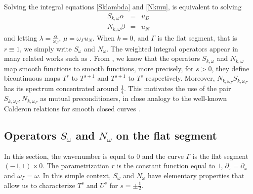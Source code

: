 \documentclass[a4paper]{article}
\begin{document}
Solving the integral equations \eqref{Sklambda} and \eqref{Nkmu}, is equivalent to solving
\begin{eqnarray*}
	S_{k,\omega} \alpha &=& u_D\\
	N_{k,\omega} \beta &=& u_N
\end{eqnarray*}
and letting $\lambda = \frac{\alpha}{\omega_\Gamma}$, $\mu = \omega_\Gamma u_N$. 
When $k = 0$, and $\Gamma$ is the flat segment, that is $r \equiv 1$, we simply write $S_{\omega}$ and $N_{\omega}$. The weighted integral operators appear in many related works such as \cite{bruno2012second,jerez2012explicit,jiang2004second}. From \cite{bruno2012second}, we know that the operators $S_{k,\omega}$ and $N_{k,\omega}$ map smooth functions to smooth functions, more precisely, for $s > 0$, they define bicontinuous maps $T^s$ to $T^{s+1}$ and $T^{s+1}$ to $T^{s}$ respectively. Moreover, $N_{k,\omega_\Gamma} S_{k,\omega_\Gamma}$ has its spectrum concentrated around $\frac{1}{4}$. This motivates the use of the pair $S_{k,\omega_\Gamma}, N_{k,\omega_\Gamma}$ as mutual preconditioners, in close analogy to the well-known Calderon relations for smooth closed curves .

\subsection{Operators $S_\omega$ and $N_\omega$ on the flat segment}

In this section, the wavenumber is equal to $0$ and the curve $\Gamma$ is the flat segment $(-1,1)\times{0}$. The parametrization $r$ is the constant function equal to $1$, $\partial_\tau = \partial_x$ and $\omega_\Gamma = \omega$. In this simple context, $S_\omega$ and $N_\omega$ have elementary properties that allow us to characterize $T^{s}$ and $U^s$ for $s = \pm \frac{1}{2}$. 
\end{document}
